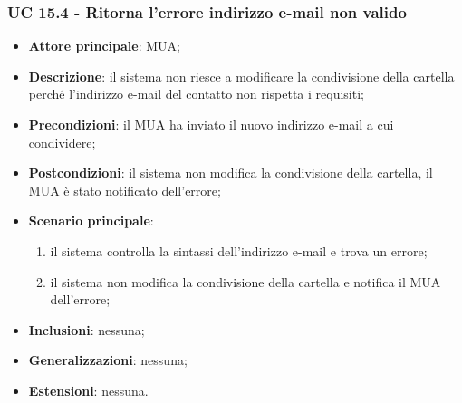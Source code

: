     \subsubsection{UC 15.4 - Ritorna l'errore indirizzo e-mail non valido} \label{sec:UC15.4}
    \begin{itemize}
        \item \textbf{Attore principale}: MUA;
        \item \textbf{Descrizione}: il sistema non riesce a modificare la condivisione della cartella perché l'indirizzo e-mail del contatto non rispetta i requisiti;
        \item \textbf{Precondizioni}: il MUA ha inviato il nuovo indirizzo e-mail a cui condividere;
        \item \textbf{Postcondizioni}: il sistema non modifica la condivisione della cartella, il MUA è stato notificato dell'errore;
        \item \textbf{Scenario principale}:
            \begin{enumerate}
                \item il sistema controlla la sintassi dell'indirizzo e-mail e trova un errore;
                \item il sistema non modifica la condivisione della cartella e notifica il MUA dell'errore;
            \end{enumerate}
        \item \textbf{Inclusioni}: nessuna;
        \item \textbf{Generalizzazioni}: nessuna;
        \item \textbf{Estensioni}: nessuna.
    \end{itemize}
